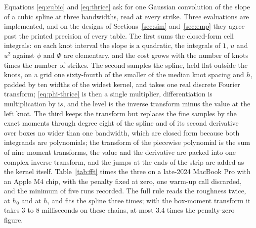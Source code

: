 \documentclass[preprint,12pt,authoryear,times]{elsarticle}
\begin{document}
Equations \eqref{eq:cubic} and \eqref{eq:thrice} ask for one Gaussian convolution of the slope of a cubic spline at three bandwidths, read at every strike. Three evaluations are implemented, and on the designs of Sections~\ref{sec:sim} and~\ref{sec:emp} they agree past the printed precision of every table. The first sums the closed-form cell integrals: on each knot interval the slope is a quadratic, the integrals of \(1\), \(u\) and \(u^2\) against \(\phi\) and \(\Phi\) are elementary, and the cost grows with the number of knots times the number of strikes. The second samples the spline, held flat outside the knots, on a grid one sixty-fourth of the smaller of the median knot spacing and \(h\), padded by ten widths of the widest kernel, and takes one real discrete Fourier transform; \eqref{eq:phi-thrice} is then a single multiplier, differentiation is multiplication by \(\mathrm{i}s\), and the level is the inverse transform minus the value at the left knot. The third keeps the transform but replaces the fine samples by the exact moments through degree eight of the spline and of its second derivative over boxes no wider than one bandwidth, which are closed form because both integrands are polynomials; the transform of the piecewise polynomial is the sum of nine moment transforms, the value and the derivative are packed into one complex inverse transform, and the jumps at the ends of the strip are added as the kernel itself. Table~\ref{tab:fft} times the three on a late-2024 MacBook Pro with an Apple M4 chip, with the penalty fixed at zero, one warm-up call discarded, and the minimum of five runs recorded. The full rule reads the roughness twice, at \(h_0\) and at \(h\), and fits the spline three times; with the box-moment transform it takes \(3\) to \(8\) milliseconds on these chains, at most \(3.4\) times the penalty-zero figure.
\end{document}
